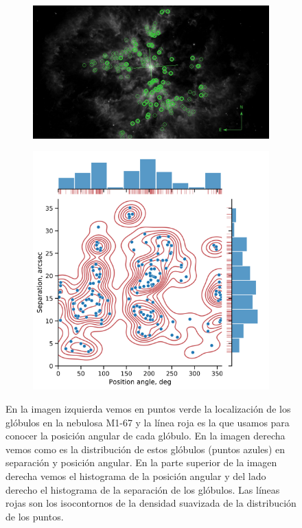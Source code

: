 \documentclass{book}
\begin{document}
\begin{figure}[htb]
    \centering  
    \begin{subfigure}[b]{0.45\linewidth}
        \includegraphics[width=\textwidth]{ultimas correcciones/M167_glo.pdf}
    \end{subfigure}
    \begin{subfigure}[b]{0.45\linewidth}
        \includegraphics[width=\textwidth]{images Chapter 2/C2_nudos_distribucion.png}
    \end{subfigure}
    \caption{En la imagen izquierda vemos en puntos verde la localización de los glóbulos en la nebulosa M1-67 y la línea roja es la que usamos para conocer la posición angular de cada glóbulo. En la imagen derecha vemos como es la distribución de estos glóbulos (puntos azules) en separación y posición angular. En la parte superior de la imagen derecha vemos el histograma de la posición angular y del lado derecho el histograma de la separación de los glóbulos. Las  líneas rojas son los isocontornos de la densidad suavizada de la distribución de los puntos.} 
    \label{fig:dis_nudos}
\end{figure}
\end{document}
